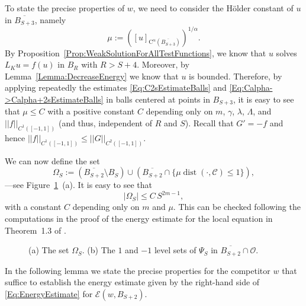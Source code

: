 \documentclass[12pt,reqno]{amsart}
\theoremstyle{definition}
\theoremstyle{remark}
\newcommand{\ccal}{\mathscr{C}}
\newcommand{\ecal}{\mathcal{E}}
\newcommand{\ocal}{\mathcal{O}}
\newcommand{\norm}[1]{\left | \left |{#1} \right | \right |}
\newcommand{\seminorm}[1]{\left [ {#1} \right ] }
\newcommand{\s}{\gamma}
\DeclareMathOperator{\dist}{dist}
\numberwithin{equation}{section}
\begin{document}
To state the precise properties of $w$, we need to consider the Hölder constant of $u$ in $\overline{B_{S+3}}$, namely
\begin{equation} 
\label{Eq:ChoiceMu} 
	\mu := \left(\seminorm{u}_{\mathrm{C^\alpha}(\overline{B_{S+3}})}\right) ^{1/\alpha}. 
\end{equation} 
By Proposition~\ref{Prop:WeakSolutionForAllTestFunctions}, we know that $u$ solves $L_K u = f(u)$ in $B_R$ with $R> S+4$. Moreover, by Lemma~\ref{Lemma:DecreaseEnergy} we know that $u$ is bounded. Therefore, by applying repeatedly the estimates \eqref{Eq:C2sEstimateBalls} and \eqref{Eq:Calpha->Calpha+2sEstimateBalls} in balls centered at points in $B_{S+3}$, it is easy to see that $\mu\leq C$ with a positive constant $C$ depending only on $m$, $\s$, $\lambda$, $\Lambda$, and $\norm{f}_{C^1([-1,1])}$ (and thus, independent of $R$ and $S$). Recall that $G' = -f$ and hence $\norm{f}_{C^1([-1,1])} \leq \norm{G}_{C^2([-1,1])}$.

We can now define the set
\begin{equation}
\label{Eq:DefOmegaS}
\Omega_S := \left( \overline{B_{S+2}}\setminus B_S \right) \cup \left(  \overline{B_{S+2}} \cap \{\mu \dist(\cdot,\ccal) \leq 1\}\right),
\end{equation} 
---see Figure~\ref{Fig:PsiSandOmegaS}~(a). It is easy to see that 
\begin{equation}
\label{Eq:MeasureOmegaS}
|\Omega_S| \leq C\,S^{2m-1},
\end{equation}
with a constant $C$ depending only on $m$ and $\mu$. This can be checked following the computations in the proof of the energy estimate for the local equation in Theorem~1.3 of \cite{CabreTerraI}. 

\begin{figure}
	\centering
	\hspace{-0.26\textwidth} 
	\begin{subfigure}{0.21\textwidth}
		\centering
		
	\end{subfigure}
	\hspace{0.28\textwidth} 
	\begin{subfigure}{0.21\textwidth}
		\centering		
		
	\end{subfigure}
	\caption{(a) The set $\Omega_S$. (b) The $1$ and $-1$ level sets of $\Psi_S$ in $\overline{B_{S+2}}\cap \ocal$.}
	\label{Fig:PsiSandOmegaS}
\end{figure}

In the following lemma we state the precise properties for the competitor $w$ that suffice to establish the energy estimate given by the right-hand side of \eqref{Eq:EnergyEstimate} for $\ecal(w,B_{S+2})$.
\end{document}
